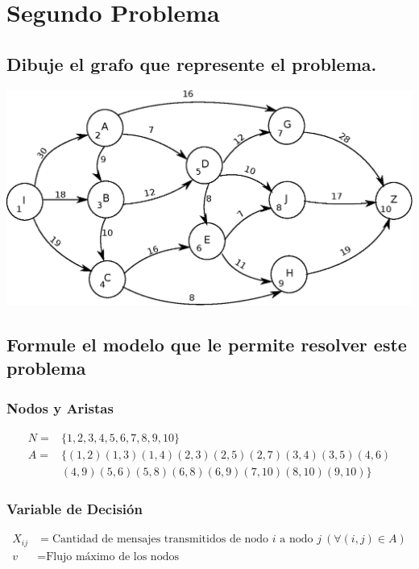 \documentclass[a4paper,12pt]{article}
\begin{document}
\section{Segundo Problema}
\subsection{Dibuje el grafo que represente el problema.}
\includegraphics[scale=1]{drawing.eps}
\subsection{Formule el modelo que le permite resolver este problema}
\subsubsection{Nodos y Aristas}
\begin{equation*}
\begin{split}
	N = &\{1,2,3,4,5,6,7,8,9,10\} \\
	A = &\{ (1,2)(1,3)(1,4)(2,3)(2,5)(2,7)(3,4)(3,5)(4,6)\\
	  &(4,9)(5,6)(5,8)(6,8)(6,9)(7,10)(8,10)(9,10) \}
\end{split}
\end{equation*}
\subsubsection{Variable de Decisión}
\begin{equation*}
\begin{split}
	X_{ij} &= \text{Cantidad de mensajes transmitidos de nodo } i \text{ a nodo } j \ (\forall(i,j)\in A)\\
	v &= \text{Flujo máximo de los nodos}
\end{split}
\end{equation*}
\end{document}
